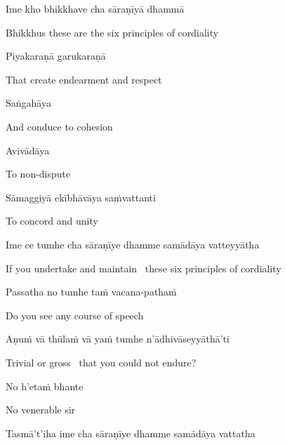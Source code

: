 Ime kho bhikkhave cha sāraṇīyā dhammā

\begin{english}
  Bhikkhus these are the six principles of cordiality
\end{english}

Piyakaraṇā garukaraṇā

\begin{english}
  That create endearment and respect
\end{english}

Saṅgahāya

\begin{english}
  And conduce to cohesion
\end{english}

Avivādāya

\begin{english}
  To non-dispute
\end{english}

\ifninebythirteenversion\clearpage\fi

Sāmaggiyā ekībhāvāya saṁvattanti

\begin{english}
  To concord and unity
\end{english}

\suttaRef{[MN 48]}

Ime ce tumhe cha sāraṇīye dhamme samādāya vatteyyātha

\begin{english}
  If you undertake and maintain \breathmark\ these six principles of cordiality
\end{english}

Passatha no tumhe taṁ vacana-pathaṁ

\begin{english}
  Do you see any course of speech
\end{english}

Aṇuṁ vā thūlaṁ vā yaṁ tumhe n'ādhivāseyyāthā'ti

\begin{english}
  Trivial or gross \breathmark\ that you could not endure?
\end{english}

\ifafiveversion\fi

No h'etaṁ bhante

\begin{english}
  No venerable sir
\end{english}

Tasmā't'iha ime cha sāraṇīye dhamme samādāya vattatha

